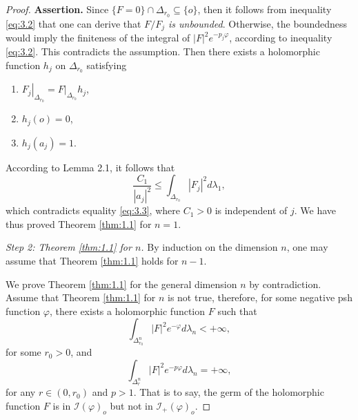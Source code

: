 \documentclass[lang=en,12pt,twoside]{textbook}
\begin{document}
\begin{proof}
\textbf{Assertion.} Since $\{F=0\} \cap \Delta_{r_0} \subseteq\{o\}$, then it follows from inequality \eqref{eq:3.2} that one can derive that \emph{$F / F_j$ is unbounded}. Otherwise, the boundedness would imply the finiteness of the integral of $|F|^2 e^{-p_j \varphi}$, according to inequality \eqref{eq:3.2}. This contradicts the assumption. Then there exists a holomorphic function $h_j$ on $\Delta_{r_0}$ satisfying
\begin{enumerate}[label=(\arabic*)]
    \item $\left.F_j\right|_{\Delta_{r_0}}=\left.F\right|_{\Delta_{r_0}} h_j$,
    \item $h_j(o)=0$,
    \item $h_j\left(a_j\right)=1$.
\end{enumerate}
According to Lemma 2.1, it follows that
$$
\frac{C_1}{\left|a_j\right|^2} \leq \int_{\Delta_{r_0}}\left|F_j\right|^2 d \lambda_1,
$$
which contradicts equality \eqref{eq:3.3}, where $C_1>0$ is independent of $j$.
We have thus proved Theorem \ref{thm:1.1} for $n=1$.

\textit{Step 2: Theorem \ref{thm:1.1} for $n$.} By induction on the dimension $n$, one may assume that Theorem \ref{thm:1.1} holds for $n-1$.

We prove Theorem \ref{thm:1.1} for the general dimension $n$ by contradiction. Assume that Theorem \ref{thm:1.1} for $n$ is not true, therefore, for some negative psh function $\varphi$, there exists a holomorphic function $F$ such that
\begin{equation}\label{eq:3.4}
    \int_{\Delta_{r_0}^n}|F|^2 e^{-\varphi} d \lambda_n<+\infty,
\end{equation}
for some $r_0>0$, and
\begin{equation}\label{eq:3.5}
    \int_{\Delta_r^n}|F|^2 e^{-p \varphi} d \lambda_n=+\infty,
\end{equation}
for any $r \in\left(0, r_0\right)$ and $p>1$. That is to say, the germ of the holomorphic function $F$ is in $\mathcal{I}(\varphi)_o$ but not in $\mathcal{I}_{+}(\varphi)_o$.


\end{proof}
\end{document}
